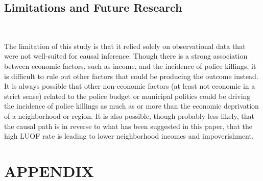 \documentclass[12pt]{article}
\begin{document}
\subsection{Limitations and Future Research} \

The limitation of this study is that it relied solely on observational data that were not well-suited for causal inference. Though there is a strong association between economic factors, such as income, and the incidence of police killings, it is difficult to rule out other factors that could be producing the outcome instead. It is always possible that other non-economic factors (at least not economic in a strict sense) related to the police budget or municipal politics could be driving the incidence of police killings as much as or more than the economic deprivation of a neighborhood or region. It is also possible, though probably less likely, that the causal path is in reverse to what has been suggested in this paper, that the high LUOF rate is leading to lower neighborhood incomes and impoverishment.
\section{APPENDIX}
\end{document}
